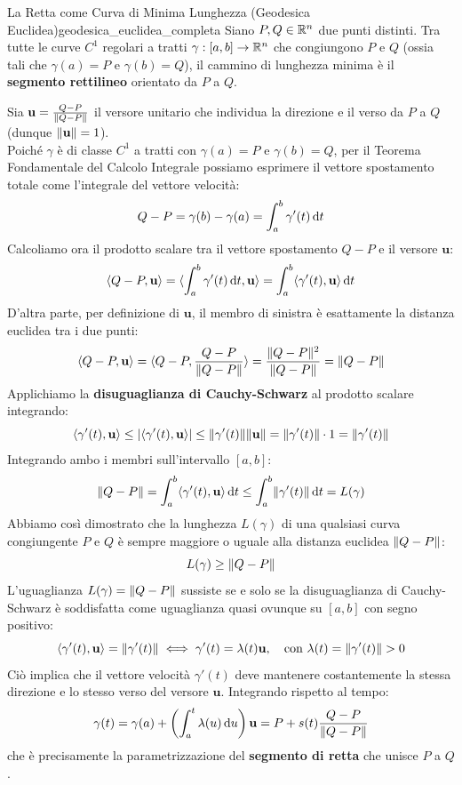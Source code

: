 \begin{teorema}{La Retta come Curva di Minima Lunghezza (Geodesica Euclidea)}{geodesica_euclidea_completa}
Siano $P, Q \in \mathbb{R}^n$ due punti distinti. Tra tutte le curve $C^1$ regolari a tratti $\gamma: [a,b] \to \mathbb{R}^n$ che congiungono $P$ e $Q$ (ossia tali che $\gamma(a) = P$ e $\gamma(b) = Q$), il cammino di lunghezza minima è il \textbf{segmento rettilineo} orientato da $P$ a $Q$.
\end{teorema}

\begin{dimostrazione}
Sia $\mathbf{u} = \frac{Q - P}{\lVert Q - P\rVert}$ il versore unitario che individua la direzione e il verso da $P$ a $Q$ (dunque $\lVert\mathbf{u}\rVert = 1$).\\
Poiché $\gamma$ è di classe $C^1$ a tratti con $\gamma(a) = P$ e $\gamma(b) = Q$, per il Teorema Fondamentale del Calcolo Integrale possiamo esprimere il vettore spostamento totale come l'integrale del vettore velocità:
\[
Q - P = \gamma(b) - \gamma(a) = \int_{a}^{b} \gamma'(t) \mathop{}\!\mathrm{d} t
\]
Calcoliamo ora il prodotto scalare tra il vettore spostamento $Q - P$ e il versore $\mathbf{u}$:
\[
\langle Q - P, \mathbf{u}\rangle = \langle\int_{a}^{b} \gamma'(t) \mathop{}\!\mathrm{d} t, \mathbf{u}\rangle = \int_{a}^{b} \langle\gamma'(t), \mathbf{u}\rangle \mathop{}\!\mathrm{d} t
\]
D'altra parte, per definizione di $\mathbf{u}$, il membro di sinistra è esattamente la distanza euclidea tra i due punti:
\[
\langle Q - P, \mathbf{u}\rangle = \langle Q - P, \frac{Q - P}{\lVert Q - P\rVert}\rangle = \frac{\lVert Q - P\rVert^2}{\lVert Q - P\rVert} = \lVert Q - P\rVert
\]
Applichiamo la \textbf{disuguaglianza di Cauchy-Schwarz} al prodotto scalare integrando:
\[
\langle\gamma'(t), \mathbf{u}\rangle \le \lvert\langle\gamma'(t), \mathbf{u}\rangle\rvert \le \lVert\gamma'(t)\rVert \lVert\mathbf{u}\rVert = \lVert\gamma'(t)\rVert \cdot 1 = \lVert\gamma'(t)\rVert
\]
Integrando ambo i membri sull'intervallo $[a,b]$:
\[
\lVert Q - P\rVert = \int_{a}^{b} \langle\gamma'(t), \mathbf{u}\rangle \mathop{}\!\mathrm{d} t \le \int_{a}^{b} \lVert\gamma'(t)\rVert \mathop{}\!\mathrm{d} t = L(\gamma)
\]
Abbiamo così dimostrato che la lunghezza $L(\gamma)$ di una qualsiasi curva congiungente $P$ e $Q$ è sempre maggiore o uguale alla distanza euclidea $\lVert Q - P\rVert$:
\[
L(\gamma) \ge \lVert Q - P\rVert
\]
L'uguaglianza $L(\gamma) = \lVert Q - P\rVert$ sussiste se e solo se la disuguaglianza di Cauchy-Schwarz è soddisfatta come uguaglianza quasi ovunque su $[a,b]$ con segno positivo:
\[
\langle\gamma'(t), \mathbf{u}\rangle = \lVert\gamma'(t)\rVert \iff \gamma'(t) = \lambda(t) \mathbf{u}, \quad \text{con } \lambda(t) = \lVert\gamma'(t)\rVert > 0
\]
Ciò implica che il vettore velocità $\gamma'(t)$ deve mantenere costantemente la stessa direzione e lo stesso verso del versore $\mathbf{u}$. Integrando rispetto al tempo:
\[
\gamma(t) = \gamma(a) + \left(\int_a^t \lambda(u)\mathop{}\!\mathrm{d} u\right) \mathbf{u} = P + s(t) \frac{Q - P}{\lVert Q - P\rVert}
\]
che è precisamente la parametrizzazione del \textbf{segmento di retta} che unisce $P$ a $Q$.
\end{dimostrazione}

